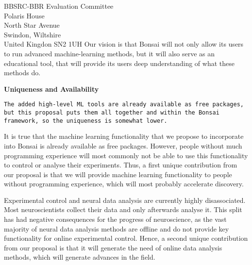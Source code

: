 \documentclass[12pt]{letter}
\begin{document}
\begin{letter}{
    BBSRC-BBR Evaluation Committee\\
    Polaris House\\
    North Star Avenue\\
    Swindon, Wiltshire\\
    United Kingdon SN2 1UH
}
Our vision is that Bonsai will not only allow its users to run advanced
machine-learning methods, but it will also serve as an educational tool, that
will provide its users deep understanding of what these methods do.

\noindent\textbf{Uniqueness and Availability}

    \texttt{The added high-level ML tools are already available as free
    packages, but this proposal puts them all together and within the Bonsai
    framework, so the uniqueness is somewhat lower.}

It is true that the machine learning functionality that we propose to
incorporate into Bonsai is already available as free packages. However, people
without much programming experience will most commonly not be able to use this
functionality to control or analyse their experiments. Thus, a first unique
contribution from our proposal is that we will provide machine learning
functionality to people without programming experience, which will most
probably accelerate discovery.

Experimental control and neural data analysis are currently highly
disassociated. Most neuroscientists collect their data and only afterwards
analyse it. This split has had negative consequences for the progress of
neuroscience, as the vast majority of neural data analysis methods are offline
and do not provide key functionality for online experimental control. Hence, a
second unique contribution from our proposal is that it will generate the need
of online data analysis methods, which will generate advances in the field.

\end{letter}
\end{document}
